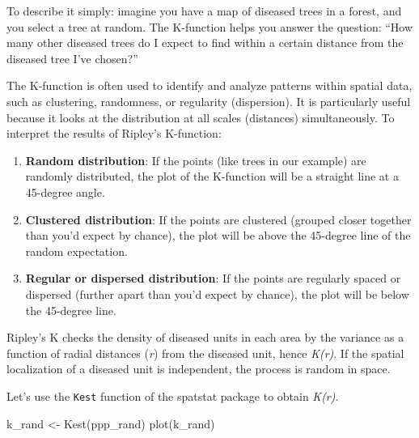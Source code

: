 \documentclass[
  letterpaper,
  DIV=11,
  numbers=noendperiod]{scrreprt}
\newenvironment{Shaded}{\begin{snugshade}}{\end{snugshade}}
\newcommand{\FunctionTok}[1]{\textcolor[rgb]{0.28,0.35,0.67}{#1}}
\newcommand{\NormalTok}[1]{\textcolor[rgb]{0.00,0.23,0.31}{#1}}
\newcommand{\OtherTok}[1]{\textcolor[rgb]{0.00,0.23,0.31}{#1}}
\begin{document}
To describe it simply: imagine you have a map of diseased trees in a
forest, and you select a tree at random. The K-function helps you answer
the question: ``How many other diseased trees do I expect to find within
a certain distance from the diseased tree I've chosen?''

The K-function is often used to identify and analyze patterns within
spatial data, such as clustering, randomness, or regularity
(dispersion). It is particularly useful because it looks at the
distribution at all scales (distances) simultaneously. To interpret the
results of Ripley's K-function:

\begin{enumerate}
\def\labelenumi{\arabic{enumi}.}
\item
  \textbf{Random distribution}: If the points (like trees in our
  example) are randomly distributed, the plot of the K-function will be
  a straight line at a 45-degree angle.
\item
  \textbf{Clustered distribution}: If the points are clustered (grouped
  closer together than you'd expect by chance), the plot will be above
  the 45-degree line of the random expectation.
\item
  \textbf{Regular or dispersed distribution}: If the points are
  regularly spaced or dispersed (further apart than you'd expect by
  chance), the plot will be below the 45-degree line.
\end{enumerate}

Ripley's K checks the density of diseased units in each area by the
variance as a function of radial distances (\emph{r}) from the diseased
unit, hence \emph{K(r)}. If the spatial localization of a diseased unit
is independent, the process is random in space.

Let's use the \texttt{Kest} function of the spatstat package to obtain
\emph{K(r)}.

\begin{Shaded}
\begin{Highlighting}[]
\NormalTok{k\_rand }\OtherTok{\textless{}{-}} \FunctionTok{Kest}\NormalTok{(ppp\_rand)}
\FunctionTok{plot}\NormalTok{(k\_rand)}
\end{Highlighting}
\end{Shaded}
\end{document}

